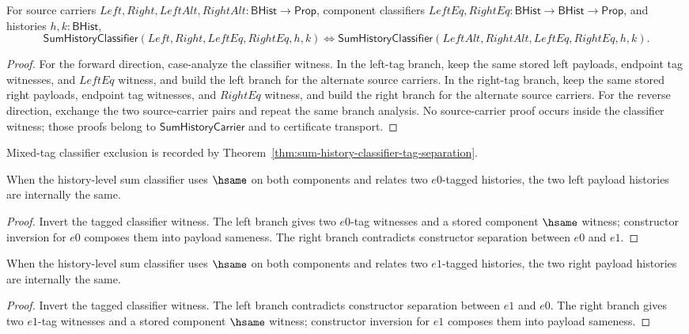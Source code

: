 \begin{theorem}
\label{thm:sum-history-classifier-source-parameter-irrelevance}
For source carriers $Left,Right,LeftAlt,RightAlt:\mathsf{BHist}\to\mathsf{Prop}$,
component classifiers $LeftEq,RightEq:\mathsf{BHist}\to\mathsf{BHist}\to\mathsf{Prop}$,
and histories $h,k:\mathsf{BHist}$,
$$
\mathsf{SumHistoryClassifier}(Left,Right,LeftEq,RightEq,h,k)
\Longleftrightarrow
\mathsf{SumHistoryClassifier}(LeftAlt,RightAlt,LeftEq,RightEq,h,k).
$$
\end{theorem}
\begin{proof}
For the forward direction, case-analyze the classifier witness. In the
left-tag branch, keep the same stored left payloads, endpoint tag witnesses,
and $LeftEq$ witness, and build the left branch for the alternate source
carriers. In the right-tag branch, keep the same stored right payloads,
endpoint tag witnesses, and $RightEq$ witness, and build the right branch for
the alternate source carriers. For the reverse direction, exchange the two
source-carrier pairs and repeat the same branch analysis. No source-carrier
proof occurs inside the classifier witness; those proofs belong to
$\mathsf{SumHistoryCarrier}$ and to certificate transport.
\end{proof}

Mixed-tag classifier exclusion is recorded by
Theorem~\ref{thm:sum-history-classifier-tag-separation}.

\begin{theorem}
\label{thm:sum-history-classifier-left-hsame-inversion}
When the history-level sum classifier uses \(\hsame\) on both components and
relates two \(e0\)-tagged histories, the two left payload histories are
internally the same.
\end{theorem}
\begin{proof}
Invert the tagged classifier witness. The left branch gives two \(e0\)-tag
witnesses and a stored component \(\hsame\) witness; constructor inversion for
\(e0\) composes them into payload sameness. The right branch contradicts
constructor separation between \(e0\) and \(e1\).
\end{proof}

\begin{theorem}
\label{thm:sum-history-classifier-right-hsame-inversion}
When the history-level sum classifier uses \(\hsame\) on both components and
relates two \(e1\)-tagged histories, the two right payload histories are
internally the same.
\end{theorem}
\begin{proof}
Invert the tagged classifier witness. The left branch contradicts constructor
separation between \(e1\) and \(e0\). The right branch gives two \(e1\)-tag
witnesses and a stored component \(\hsame\) witness; constructor inversion for
\(e1\) composes them into payload sameness.
\end{proof}

